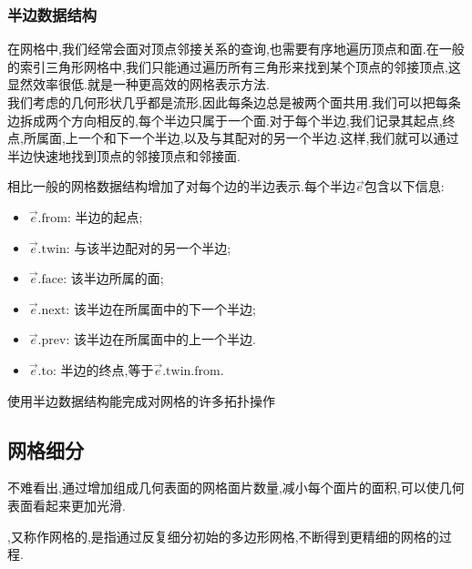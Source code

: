\documentclass{ctexart}
\begin{document}
\subsubsection{半边数据结构}
在网格中,我们经常会面对顶点邻接关系的查询,也需要有序地遍历顶点和面.在一般的索引三角形网格中,我们只能通过遍历所有三角形来找到某个顶点的邻接顶点,这显然效率很低.就是一种更高效的网格表示方法.\\
\indent 我们考虑的几何形状几乎都是流形,因此每条边总是被两个面共用.我们可以把每条边拆成两个方向相反的,每个半边只属于一个面.对于每个半边,我们记录其起点,终点,所属面,上一个和下一个半边,以及与其配对的另一个半边.这样,我们就可以通过半边快速地找到顶点的邻接顶点和邻接面.
\begin{definition}[半边数据结构]
    相比一般的网格数据结构增加了对每个边的半边表示.每个半边$\vec{e}$包含以下信息:
    \begin{itemize}[topsep=0pt,parsep=0pt,itemsep=0pt,partopsep=0pt]
        \item $\vec{e}.\text{from}$: 半边的起点;
        \item $\vec{e}.\text{twin}$: 与该半边配对的另一个半边;
        \item $\vec{e}.\text{face}$: 该半边所属的面;
        \item $\vec{e}.\text{next}$: 该半边在所属面中的下一个半边;
        \item $\vec{e}.\text{prev}$: 该半边在所属面中的上一个半边.
        \item $\vec{e}.\text{to}$: 半边的终点,等于$\vec{e}.\text{twin}.\text{from}$.
    \end{itemize}
\end{definition}
使用半边数据结构能完成对网格的许多拓扑操作
\subsection{网格细分}
不难看出,通过增加组成几何表面的网格面片数量,减小每个面片的面积,可以使几何表面看起来更加光滑.
\begin{definition}[网格细分]
    ,又称作网格的,是指通过反复细分初始的多边形网格,不断得到更精细的网格的过程.
\end{definition}
\end{document}
